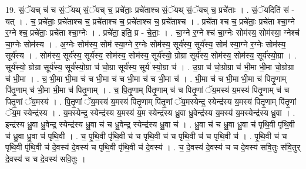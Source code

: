 \documentclass[17pt]{extarticle}
\begin{document}
19. सं॒ॅयच् च॑ च सं॒ॅयथ् सं॒ॅयच् च॒ प्रचे॑ताः॒ प्रचे॑ताश्च सं॒ॅयथ् सं॒ॅयच् च॒ प्रचे॑ताः । . सं॒ॅयदिति॑ सं - यत् । . च॒ प्रचे॑ताः॒ प्रचे॑ताश्च च॒ प्रचे॑ताश्च च॒ प्रचे॑ताश्च च॒ प्रचे॑ताश्च । . प्रचे॑ता श्च च॒ प्रचे॑ताः॒ प्रचे॑ता श्चा॒ग्ने र॒ग्ने श्च॒ प्रचे॑ताः॒ प्रचे॑ता श्चा॒ग्नेः । . प्रचे॑ता॒ इति॒ प्र - चे॒ताः॒ । . चा॒ग्ने र॒ग्ने श्च॑ चा॒ग्नेः सोम॑स्य॒ सोम॑स्या॒ ग्नेश्च॑ चा॒ग्नेः सोम॑स्य । . अ॒ग्नेः सोम॑स्य॒ सोम॑ स्या॒ग्ने र॒ग्नेः सोम॑स्य॒ सूर्य॑स्य॒ सूर्य॑स्य॒ सोम॑ स्या॒ग्ने र॒ग्नेः सोम॑स्य॒ सूर्य॑स्य । . सोम॑स्य॒ सूर्य॑स्य॒ सूर्य॑स्य॒ सोम॑स्य॒ सोम॑स्य॒ सूर्य॑स्यो॒ ग्रोग्रा सूर्य॑स्य॒ सोम॑स्य॒ सोम॑स्य॒ 
सूर्य॑स्यो॒ग्रा । . सूर्य॑स्यो॒ ग्रोग्रा सूर्य॑स्य॒ सूर्य॑स्यो॒ग्रा च॑ चो॒ग्रा सूर्य॑स्य॒ सूर्य॑ स्यो॒ग्रा च॑ । . उ॒ग्रा च॑ चो॒ग्रोग्रा च॑ भी॒मा भी॒मा चो॒ग्रोग्रा च॑ भी॒मा । . च॒ भी॒मा भी॒मा च॑ च भी॒मा च॑ च भी॒मा च॑ च भी॒मा च॑ । . भी॒मा च॑ च भी॒मा भी॒मा च॑ पितृ॒णाम् पि॑तृ॒णाम् च॑ भी॒मा भी॒मा च॑ पितृ॒णाम् । . च॒ पि॒तृ॒णाम् पि॑तृ॒णाम् च॑ च पितृ॒णां ॅय॒मस्य॑ य॒मस्य॑ पितृ॒णाम् च॑ च पितृ॒णां ॅय॒मस्य॑ । . पि॒तृ॒णां ॅय॒मस्य॑ य॒मस्य॑ पितृ॒णाम् पि॑तृ॒णां ॅय॒मस्येन्द्र॒ स्येन्द्र॑स्य य॒मस्य॑ पितृ॒णाम् पि॑तृ॒णां ॅय॒म स्येन्द्र॑स्य । . य॒मस्येन्द्र॒ स्येन्द्र॑स्य य॒मस्य॑ य॒म स्येन्द्र॑स्य ध्रु॒वा ध्रु॒वेन्द्र॑स्य य॒मस्य॑ य॒मस्येन्द्र॑स्य ध्रु॒वा । . इन्द्र॑स्य ध्रु॒वा ध्रु॒वेन्द्र॒ स्येन्द्र॑स्य ध्रु॒वा च॑ च ध्रु॒वेन्द्र॒ स्येन्द्र॑स्य ध्रु॒वा च॑ । . ध्रु॒वा च॑ च ध्रु॒वा ध्रु॒वा च॑ पृथि॒वी पृ॑थि॒वी च॑ ध्रु॒वा ध्रु॒वा च॑ पृथि॒वी । . च॒ पृ॒थि॒वी पृ॑थि॒वी च॑ च पृथि॒वी च॑ च पृथि॒वी च॑ च पृथि॒वी च॑ । . पृ॒थि॒वी च॑ च पृथि॒वी पृ॑थि॒वी च॑ दे॒वस्य॑ दे॒वस्य॑ च पृथि॒वी पृ॑थि॒वी च॑ दे॒वस्य॑ । . च॒ दे॒वस्य॑ दे॒वस्य॑ च च दे॒वस्य॑ सवि॒तुः स॑वि॒तुर् दे॒वस्य॑ च च दे॒वस्य॑ सवि॒तुः । \newline
\end{document}
